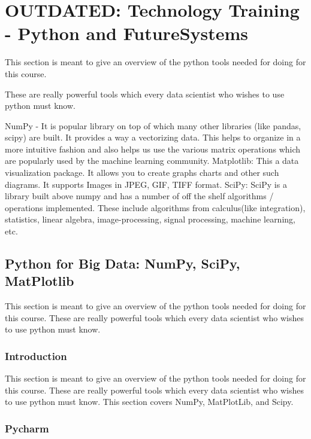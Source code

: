 \FILENAME

\section{OUTDATED: Technology Training - Python and FutureSystems}


This section is meant to give an overview of the python tools needed for
doing for this course.

These are really powerful tools which every data scientist who wishes to
use python must know.

NumPy - It is popular library on top of which many other libraries (like
pandas, scipy) are built. It provides a way a vectorizing data. This
helps to organize in a more intuitive fashion and also helps us use the
various matrix operations which are popularly used by the machine
learning community. Matplotlib: This a data visualization package. It
allows you to create graphs charts and other such diagrams. It supports
Images in JPEG, GIF, TIFF format. SciPy: SciPy is a library built above
numpy and has a number of off the shelf algorithms / operations
implemented. These include algorithms from calculus(like integration),
statistics, linear algebra, image-processing, signal processing, machine
learning, etc.

\subsection{Python for Big Data: NumPy, SciPy,
MatPlotlib}\label{python-for-big-data-numpy-scipy-matplotlib}

This section is meant to give an overview of the python tools needed for
doing for this course. These are really powerful tools which every data
scientist who wishes to use python must know.

\subsubsection{Introduction}\label{introduction}

This section is meant to give an overview of the python tools needed for
doing for this course. These are really powerful tools which every data
scientist who wishes to use python must know. This section covers NumPy,
MatPlotLib, and Scipy.

\subsubsection{Pycharm}\label{pycharm}

